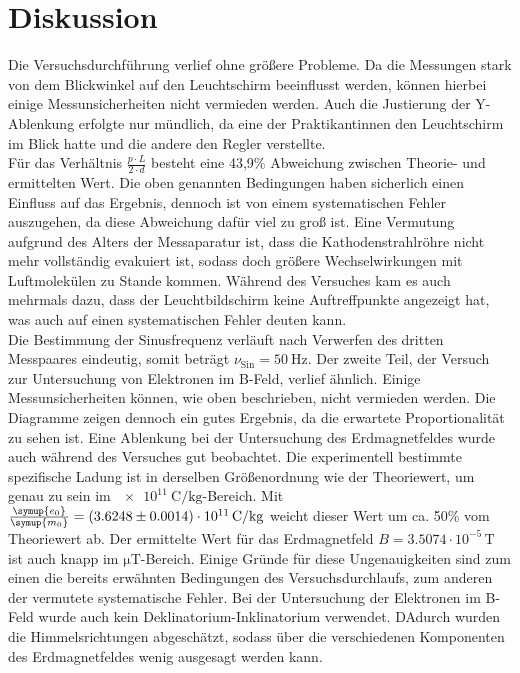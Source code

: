 \section{Diskussion}
\label{sec:Diskussion}

Die Versuchsdurchführung verlief ohne größere Probleme.
Da die Messungen stark von dem Blickwinkel auf den Leuchtschirm beeinflusst werden, können hierbei einige Messunsicherheiten nicht vermieden werden.
Auch die Justierung der Y-Ablenkung erfolgte nur mündlich, da eine der Praktikantinnen den Leuchtschirm im Blick hatte und die andere den Regler verstellte.
\\
\noindent
Für das Verhältnis $\frac{p \cdot L}{2\cdot d}$ besteht eine 43,9\% Abweichung zwischen Theorie- und ermittelten Wert.
Die oben genannten Bedingungen haben sicherlich einen Einfluss auf das Ergebnis, dennoch ist von einem systematischen Fehler auszugehen, da diese Abweichung dafür viel zu groß ist.
Eine Vermutung aufgrund des Alters der Messaparatur ist, dass die Kathodenstrahlröhre nicht mehr vollständig evakuiert ist, sodass doch größere Wechselwirkungen mit Luftmolekülen zu Stande kommen.
Während des Versuches kam es auch mehrmals dazu, dass der Leuchtbildschirm keine Auftreffpunkte angezeigt hat, was auch auf einen systematischen Fehler deuten kann.
\\
\noindent
Die Bestimmung der Sinusfrequenz verläuft nach Verwerfen des dritten Messpaares eindeutig, somit beträgt $\nu_\text{Sin} = \SI{50}{\hertz}$.
\noindent
Der zweite Teil, der Versuch zur Untersuchung von Elektronen im B-Feld, verlief ähnlich.
Einige Messunsicherheiten können, wie oben beschrieben, nicht vermieden werden.
Die Diagramme zeigen dennoch ein gutes Ergebnis, da die erwartete Proportionalität zu sehen ist.
Eine Ablenkung bei der Untersuchung des Erdmagnetfeldes wurde auch während des Versuches gut beobachtet.
Die experimentell bestimmte spezifische Ladung ist in derselben Größenordnung wie der Theoriewert, um genau zu sein im $\SI{e11}{\coulomb\per\kilo\gram}$-Bereich.
Mit $\frac{\symup{e_0}}{\symup{m_0}} = (3.6248\pm 0.0014) \cdot 10^{11} \, \si{\coulomb\per\kilo\gram}$ weicht dieser Wert um ca. 50\% vom Theoriewert ab.
Der ermittelte Wert für das Erdmagnetfeld $B = 3.5074 \cdot 10^{-5} \, \si{\tesla}$ ist auch knapp im $\si{\micro\tesla}$-Bereich.
Einige Gründe für diese Ungenauigkeiten sind zum einen die bereits erwähnten Bedingungen des Versuchsdurchlaufs, zum anderen der vermutete systematische Fehler.
Bei der Untersuchung der Elektronen im B-Feld wurde auch kein Deklinatorium-Inklinatorium verwendet.
DAdurch wurden die Himmelsrichtungen abgeschätzt, sodass über die verschiedenen Komponenten des Erdmagnetfeldes wenig ausgesagt werden kann.